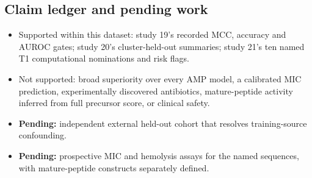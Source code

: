 \subsection{Claim ledger and pending work}
\begin{itemize}
\item Supported within this dataset: study 19's recorded MCC, accuracy and AUROC gates; study 20's cluster-held-out summaries; study 21's ten named T1 computational nominations and risk flags.
\item Not supported: broad superiority over every AMP model, a calibrated MIC prediction, experimentally discovered antibiotics, mature-peptide activity inferred from full precursor score, or clinical safety.
\item \textbf{Pending:} independent external held-out cohort that resolves training-source confounding.
\item \textbf{Pending:} prospective MIC and hemolysis assays for the named sequences, with mature-peptide constructs separately defined.
\end{itemize}

